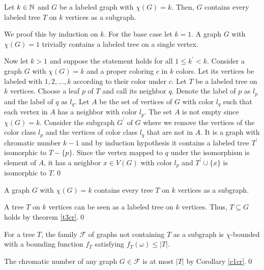 \begin{thm}\label{t3cr}
Let $k\in\mathbb{N}$ and $G$ be a labeled graph with $\chi (G) = k$. Then, $G$ contains every labeled tree $T$ on $k$ vertices as a subgraph. 
\end{thm}
\begin{prf}
We proof this by induction on $k$. For the base case let $k=1$. A graph $G$ with $\chi (G)=1$ trivially contains a labeled tree on a single vertex.

Now let $k>1$ and suppose the statement holds for all $1\leq k^\prime <k$. Consider a graph $G$ with $\chi (G) = k$ and a proper coloring $c$ in $k$ colors. Let its vertices be labeled with $1, 2, \dots , k$ according to their color under $c$. Let $T$ be a labeled tree on $k$ vertices. Choose a leaf $p$ of $T$ and call its neighbor $q$. Denote the label of $p$ as $l_p$ and the label of $q$ as $l_q$. Let $A$ be the set of vertices of $G$ with color $l_q$ such that each vertex in $A$ has a neighbor with color $l_p$. The set $A$ is not empty since $\chi (G)=k$. Consider the subgraph $G^\prime$ of $G$ where we remove the vertices of the color class $l_p$ and the vertices of color class $l_q$ that are not in $A$. It is a graph with chromatic number $k-1$ and by induction hypothesis it contains a labeled tree $T^\prime$ isomorphic to $T-\lbrace p\rbrace$. Since the vertex mapped to $q$ under the isomorphism is element of $A$, it has a neighbor $x\in V(G)$ with color $l_p$ and $T^\prime\cup\lbrace x\rbrace$ is isomorphic to $T$.\qed
\end{prf}
\begin{cor}\label{c1cr}
A graph $G$ with $\chi (G) = k$ contains every tree $T$ on $k$ vertices as a subgraph. 
\end{cor}
\begin{prf}
A tree $T$ on $k$ vertices can be seen as a labeled tree on $k$ vertices. Thus, $T\subseteq G$ holds by theorem \ref{t3cr}.\qed
\end{prf}

\begin{cor}
For a tree $T$, the family $\mathcal{F}$ of graphs not containing $T$ as a subgraph is $\chi$-bounded with a bounding function $f_T$ satisfying $f_T(\omega )\leq\vert T\vert$.
\end{cor}
\begin{prf}
The chromatic number of any graph $G\in\mathcal{F}$ is at most $\vert T\vert$ by Corollary \ref{c1cr}.\qed
\end{prf}

